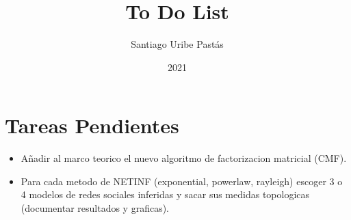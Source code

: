 \documentclass{article}
\title{To Do List}
\author{Santiago Uribe Pastás}
\date{2021}
\begin{document}
\maketitle

\section{Tareas Pendientes}
\begin{itemize}
    \item Añadir al marco teorico el nuevo algoritmo de factorizacion matricial (CMF).
    \item Para cada metodo de NETINF (exponential, powerlaw, rayleigh) escoger 3 o 4 modelos de redes sociales inferidas y sacar sus medidas topologicas (documentar resultados y graficas).
\end{itemize}
\end{document}
